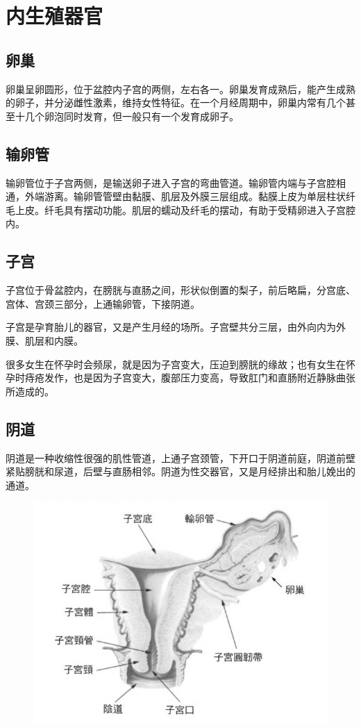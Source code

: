 \documentclass[12pt,UTF8]{ctexbook}
\begin{document}
\section{内生殖器官}

\subsection{卵巢}

卵巢呈卵圆形，位于盆腔内子宫的两侧，左右各一。卵巢发育成熟后，能产生成熟的卵子，并分泌雌性激素，维持女性特征。在一个月经周期中，卵巢内常有几个甚至十几个卵泡同时发育，但一般只有一个发育成卵子。

\subsection{输卵管}

输卵管位于子宫两侧，是输送卵子进入子宫的弯曲管道。输卵管内端与子宫腔相通，外端游离。输卵管管壁由黏膜、肌层及外膜三层组成。黏膜上皮为单层柱状纤毛上皮。纤毛具有摆动功能。肌层的蠕动及纤毛的摆动，有助于受精卵进入子宫腔内。

\subsection{子宫}

子宫位于骨盆腔内，在膀胱与直肠之间，形状似倒置的梨子，前后略扁，分宫底、宫体、宫颈三部分，上通输卵管，下接阴道。

子宫是孕育胎儿的器官，又是产生月经的场所。子宫壁共分三层，由外向内为外膜、肌层和内膜。

很多女生在怀孕时会频尿，就是因为子宫变大，压迫到膀胱的缘故；也有女生在怀孕时痔疮发作，也是因为子宫变大，腹部压力变高，导致肛门和直肠附近静脉曲张所造成的。

\subsection{阴道}

阴道是一种收缩性很强的肌性管道，上通子宫颈管，下开口于阴道前庭，阴道前壁紧贴膀胱和尿道，后壁与直肠相邻。阴道为性交器官，又是月经排出和胎儿娩出的通道。

\begin{figure}[H]
	\centering
	\includegraphics[width=0.7\linewidth]{3}
	\caption{}
\end{figure}
\end{document}
